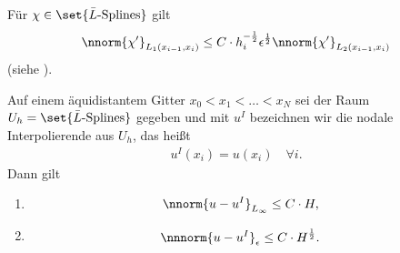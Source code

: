 \begin{bemerkung*}
  Für $\chi \in \set{\bar L\text{-Splines}}$ gilt
  \begin{align*}
    \nnorm{\chi'}_{L_{1}(x_{i-1}, x_{i})} \leq C\cdot h_{i}^{- \frac 12} \epsilon^{\frac 12}\nnorm{\chi'}_{L_{2}(x_{i-1}, x_{i})}
  \end{align*}
  (siehe \cite{OS_MC}). 
\end{bemerkung*}
\begin{lemma}\label{lem:6-4}
  Auf einem äquidistantem Gitter $x_{0}< x_{1}< \dots < x_{N}$ sei der Raum $U_{h} = \set{\bar L\text{-Splines}}$ gegeben und mit $u^{I}$ bezeichnen wir die nodale Interpolierende aus $U_{h}$, das heißt
  \begin{align*}
    u^{I}(x_{i}) = u(x_{i}) \quad \forall i. 
  \end{align*}
  Dann gilt
  \begin{enumerate}
  \item \begin{align*}
      \nnorm{u-u^{I}}_{L_{\infty}} &\leq C\cdot H, 
    \end{align*}
  \item
    \begin{align*}
      \nnnorm{u-u^{I}}_{\epsilon} &\leq  C\cdot H^{\frac 12}. 
    \end{align*}
  \end{enumerate}
\end{lemma}
